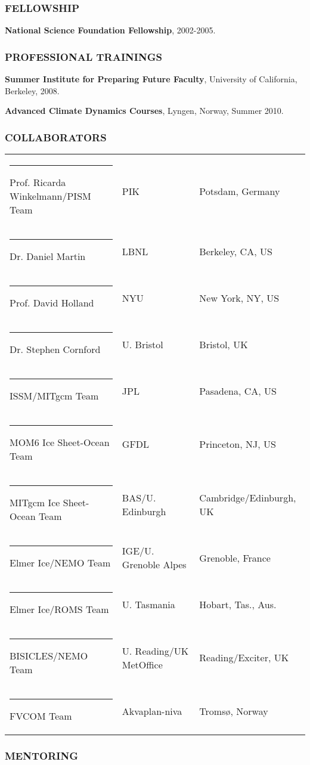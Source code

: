 \documentclass[12pt,letterpaper]{article}
\begin{document}
\begin{flushleft}
\subsubsection*{\color{titleBlue} FELLOWSHIP}

{\bf National Science Foundation Fellowship}, 2002-2005.

\subsubsection*{\color{titleBlue} PROFESSIONAL TRAININGS}

{\bf Summer Institute for Preparing Future Faculty}, 
University of California, Berkeley, 2008.

{\bf Advanced Climate Dynamics Courses},
Lyngen, Norway, Summer 2010.

\subsubsection*{\color{titleBlue} COLLABORATORS} 

\begin{tabular}{@{} l l l@{} }
\rule{-4pt}{16pt} Prof. Ricarda Winkelmann/PISM Team & PIK &  Potsdam, Germany \\
\rule{-4pt}{16pt} Dr. Daniel Martin & LBNL & Berkeley, CA, US\\
\rule{-4pt}{16pt} Prof. David Holland & NYU & New York, NY, US \\ 
\rule{-4pt}{16pt} Dr. Stephen Cornford & U. Bristol & Bristol, UK\\
\rule{-4pt}{16pt} ISSM/MITgcm Team & JPL & Pasadena, CA, US\\
\rule{-4pt}{16pt} MOM6 Ice Sheet-Ocean Team & GFDL & Princeton, NJ, US\\
\rule{-4pt}{16pt} MITgcm Ice Sheet-Ocean Team & BAS/U. Edinburgh & Cambridge/Edinburgh, UK\\
\rule{-4pt}{16pt} Elmer Ice/NEMO Team & IGE/U. Grenoble Alpes & Grenoble, France\\
\rule{-4pt}{16pt} Elmer Ice/ROMS Team & U. Tasmania & Hobart, Tas., Aus.\\
\rule{-4pt}{16pt} BISICLES/NEMO Team & U. Reading/UK MetOffice & Reading/Exciter, UK\\
\rule{-4pt}{16pt} FVCOM Team & Akvaplan-niva & Troms{\o}, Norway\\
\end{tabular}

\subsubsection*{\color{titleBlue} MENTORING} 


\end{flushleft}
\end{document}
